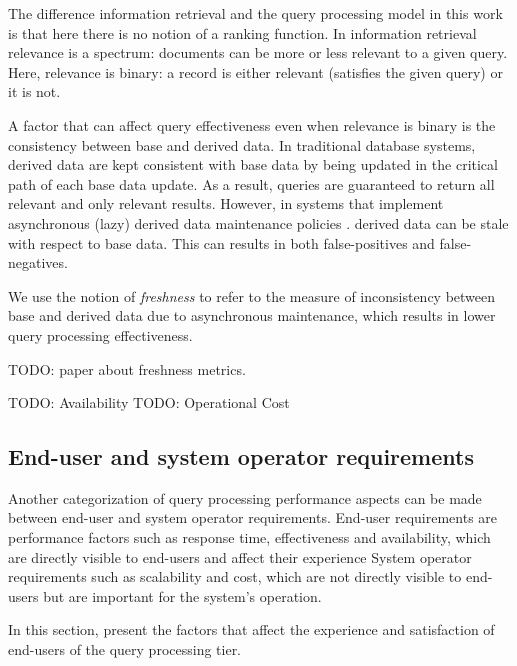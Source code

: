 The difference information retrieval and the query processing model in this work is that here there is no notion of a
ranking function.
In information retrieval relevance is a spectrum: documents can be more or less relevant to a given query.
Here, relevance is binary: a record is either relevant (satisfies the given query) or it is not.

A factor that can affect query effectiveness even when relevance is binary is the consistency between base
and derived data.
In traditional database systems, derived data are kept consistent with base data by being updated in the critical path
of each base data update.
As a result, queries are guaranteed to return all relevant and only relevant results.
However, in systems that implement asynchronous (lazy) derived data maintenance policies \cite{tan:diffindex,
qi:secondaryindexconsistencyanalysis, shukla:schemaagnostic}. derived data can be stale with respect to base data.
This can results in both false-positives and false-negatives.

We use the notion of \textit{freshness} to refer to the measure of inconsistency between base and derived data due to
asynchronous maintenance, which results in lower query processing effectiveness.

TODO: paper about freshness metrics.

TODO: Availability
TODO: Operational Cost


\subsection{End-user and system operator requirements}

Another categorization of query processing performance aspects can be made between end-user and system operator
requirements.
End-user requirements are performance factors such as response time, effectiveness and availability, which are directly
visible to end-users and affect their experience
System operator requirements such as scalability and cost, which are not directly visible to end-users but are important
for the system's operation.


In this section, present the factors that affect the experience and satisfaction of end-users of the query processing
tier.



